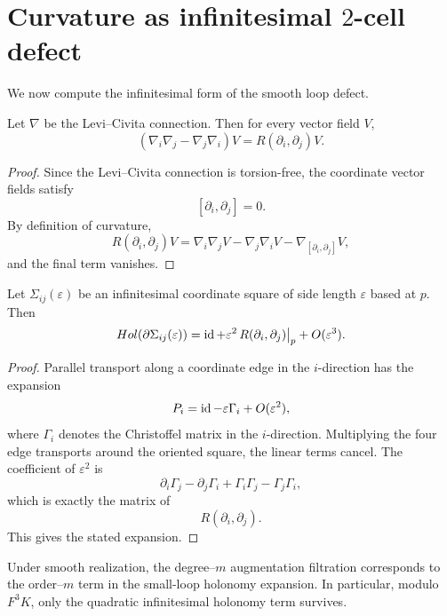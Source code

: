 \section{\texorpdfstring{Curvature as infinitesimal \(2\)-cell defect}{Curvature as infinitesimal 2-cell defect}}
We now compute the infinitesimal form of the smooth loop defect.
\begin{proposition}
	Let \(\nabla\) be the Levi--Civita connection.  Then for every vector
	field \(V\),
	\[
		(\nabla_i\nabla_j-\nabla_j\nabla_i)V
		=
		R(\partial_i,\partial_j)V.
	\]
\end{proposition}
\begin{proof}
	Since the Levi--Civita connection is torsion-free, the coordinate
	vector fields satisfy
	\[
		[\partial_i,\partial_j]=0.
	\]
	By definition of curvature,
	\[
		R(\partial_i,\partial_j)V
		=
		\nabla_i\nabla_jV-\nabla_j\nabla_iV-\nabla_{[\partial_i,\partial_j]}V,
	\]
	and the final term vanishes.
\end{proof}
\begin{corollary}
	\label{cor:infdef}
	Let \(\Sigma_{ij}(\varepsilon)\) be an infinitesimal coordinate square
	of side length \(\varepsilon\) based at \(p\).  Then
	\[
		Hol(\partial\Sigma_{ij}(\varepsilon))
		=
		\operatorname{id}
		+
		\varepsilon^2\,R(\partial_i,\partial_j)\big|_p
		+
		O(\varepsilon^3).
	\]
\end{corollary}
\begin{proof}
	Parallel transport along a coordinate edge in the \(i\)-direction has
	the expansion
	\[
		P_i=\operatorname{id}-\varepsilon \Gamma_i+O(\varepsilon^2),
	\]
	where \(\Gamma_i\) denotes the Christoffel matrix in the \(i\)-direction.
	Multiplying the four edge transports around the oriented square, the
	linear terms cancel.  The coefficient of \(\varepsilon^2\) is
	\[
		\partial_i\Gamma_j-\partial_j\Gamma_i
		+\Gamma_i\Gamma_j-\Gamma_j\Gamma_i,
	\]
	which is exactly the matrix of
	\[
		R(\partial_i,\partial_j).
	\]
	This gives the stated expansion.
\end{proof}
\begin{lemma}
	\label{lem:filtration-holonomy-order}
	Under smooth realization, the degree--\(m\) augmentation filtration
	corresponds to the order--\(m\) term in the small-loop holonomy
	expansion.  In particular, modulo \(F^3K\), only the quadratic
	infinitesimal holonomy term survives.
\end{lemma}
